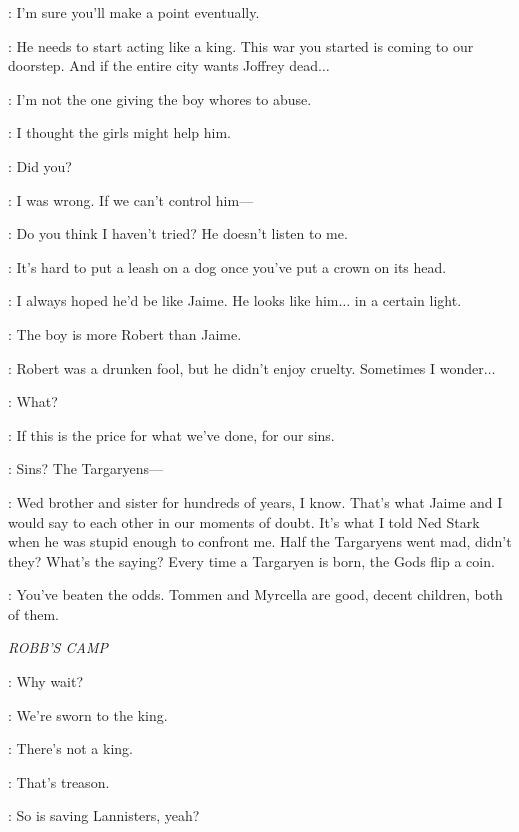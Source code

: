 \CERSEI: I'm sure you'll make a point eventually.

\TYRION: He needs to start acting like a king. This war you started is coming to our doorstep. And if the entire city wants Joffrey dead$\ldots$

\CERSEI: I'm not the one giving the boy whores to abuse.

\TYRION: I thought the girls might help him.

\CERSEI: Did you?

\TYRION: I was wrong. If we can't control him---

\CERSEI: Do you think I haven't tried? He doesn't listen to me.

\TYRION: It's hard to put a leash on a dog once you've put a crown on its head.

\CERSEI: I always hoped he'd be like Jaime. He looks like him$\ldots$ in a certain light.

\TYRION: The boy is more Robert than Jaime.

\CERSEI: Robert was a drunken fool, but he didn't enjoy cruelty. Sometimes I wonder$\ldots$

\TYRION: What?

\CERSEI: If this is the price for what we've done, for our sins.

\TYRION: Sins? The Targaryens---

\CERSEI: Wed brother and sister for hundreds of years, I know. That's what Jaime and I would say to each other in our moments of doubt. It's what I told Ned Stark when he was stupid enough to confront me. Half the Targaryens went mad, didn't they? What's the saying? Every time a Targaryen is born, the Gods flip a coin.

\TYRION: You've beaten the odds. Tommen and Myrcella are good, decent children, both of them.



\scene

\textit{ROBB'S CAMP}


\SOLDIERa: Why wait?

\SOLDIERb: We're sworn to the king.

\SOLDIERa: There's not a king.

\SOLDIERb: That's treason.

\SOLDIERa: So is saving Lannisters, yeah?

